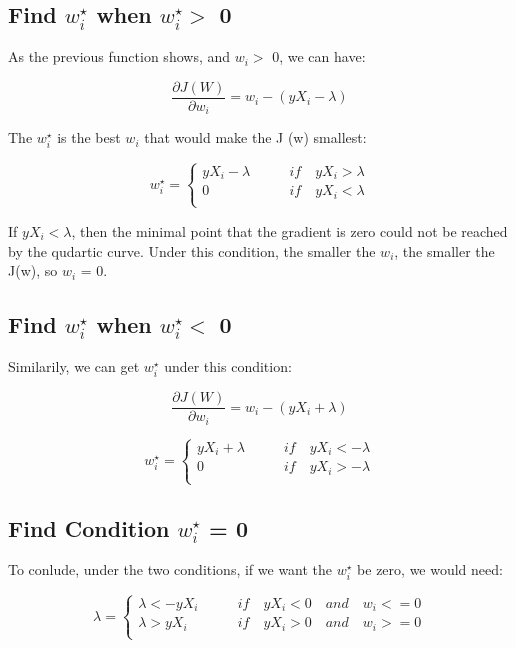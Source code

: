 \documentclass{article} %
\begin{document}
\subsection{Find $w_i^{\star}$ when $w_i^{\star} > $ 0}
As the previous function shows, and $w_i >$ 0, we can have:

\begin{equation}
\frac{\partial J(W)}{\partial w_i} = w_i - (yX_i - \lambda) 
\end{equation}

The $w_i^{\star}$ is the best $w_i$ that would make the J (w) smallest:

\[ w_i^{\star} =
    \begin{cases}
        yX_i - \lambda & \qquad if \quad yX_i > \lambda \\
        0              & \qquad if \quad yX_i < \lambda \\
    \end{cases}
\]

If $yX_i < \lambda$, then the minimal point that the gradient is zero could not
be reached by the qudartic curve. Under this condition, the smaller the $w_i$,
the smaller the J(w), so $w_i$ = 0.


\subsection{Find $w_i^{\star}$ when $w_i^{\star} < $ 0}
Similarily, we can get $w_i^{\star}$ under this condition:

\begin{equation}
\frac{\partial J(W)}{\partial w_i} = w_i - (yX_i + \lambda)
\end{equation}

\[ w_i^{\star} =
    \begin{cases}
        yX_i + \lambda & \qquad if \quad yX_i < -\lambda \\
        0              & \qquad if \quad yX_i > -\lambda \\
    \end{cases}
\]


\subsection{Find Condition $w_i^{\star}$ = 0}
To conlude, under the two conditions, if we want the $w_i^{\star}$ be zero, we
would need:

\[ \lambda =
    \begin{cases}
        \lambda < -yX_i   & \qquad if \quad yX_i < 0 \quad and \quad w_i <= 0 \\
        \lambda >  yX_i   & \qquad if \quad yX_i > 0 \quad and \quad w_i >= 0 \\
    \end{cases}
\]
\end{document}
